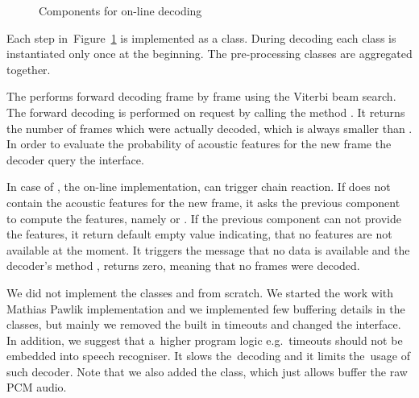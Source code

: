 \begin{figure}[!htp]
    \begin{center}
        
        \caption{Components for on-line decoding}
    \label{fig:online_pipeline} 
    \end{center}
\end{figure}

Each step in~Figure~\ref{fig:online_pipeline} is implemented as a class.
During decoding each class is instantiated only once at the beginning.
The pre-processing classes are aggregated together. 

The  performs forward decoding frame by frame using the Viterbi beam search.
The forward decoding is performed on request by calling the method .
It returns the number of frames which were actually decoded, which is always smaller than .
In order to evaluate the probability of acoustic features for the new frame
the decoder query the  interface.

In case of , the on-line implementation, can trigger chain reaction.
If  does not contain the acoustic features for the new frame, it asks
the previous component to compute the features, namely  or .
If the previous component can not provide the features, it return default empty value indicating,
that no features are not available at the moment. It triggers the message that no data is available
and the decoder's method , returns zero, meaning that no frames were decoded.


We did not implement the classes  and 
from scratch. We started the work with Mathias Pawlik implementation and we implemented few buffering details
in the classes, but mainly we removed the built in timeouts and changed the interface.
In addition, we suggest that a~higher program logic e.g.\ timeouts should not be embedded into speech recogniser.
It slows the~decoding and it limits the~usage of such decoder.
Note that we also added the  class, which just allows buffer the raw \ac{PCM} audio.



